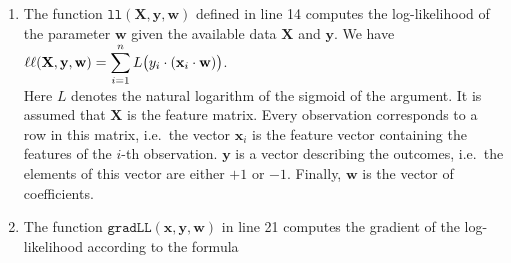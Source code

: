 \begin{enumerate}
      The argument that $\ln\bigl(1 + \exp(1000)\bigr) \approx 1000$ works as follows:
      \\[0.2cm]
      \hspace*{1.3cm}
      $
      \begin{array}{lcll}
        \ln\bigl(1+\exp(x)\bigr) & = & \ln\bigl(\exp(x) \cdot (1+\exp(-x))\bigr)          \\[0.2cm]
                                 & = & \ln\bigl(\exp(x)\bigr) + \ln\bigl(1+\exp(-x)\bigr) \\[0.2cm]
                                 & = & x + \ln\bigl(1+\exp(-x)\bigr) \\[0.2cm]
                                 & \approx & x + \ln(1) + \exp(-x) & \mbox{Taylor expansion of $\ln(1+x)$} \\[0.2cm]
                                 & = & x + 0 + \exp(-x)                                      \\[0.2cm]
                                 & \approx & x                & \mbox{since $\exp(-x) \approx 0$ for large $x$} 
      \end{array}
      $
      \\[0.2cm]
      This is the reason that \texttt{logSigmoid} returns \texttt{x} if the value of \texttt{x} is less than
      $-100$.
\item The function $\mathtt{ll}(\mathbf{X}, \mathbf{y}, \mathbf{w})$ defined in line 14 computes the
      log-likelihood of the parameter $\mathbf{w}$ given the available data $\mathbf{X}$ and $\mathbf{y}$.
      We have
      \\[0.2cm]
      \hspace*{1.3cm}
      $\displaystyle \ell\ell(\mathbf{X},\mathbf{y},\mathbf{w}) = 
           \sum\limits_{i=1}^n L\bigl(y_i \cdot(\mathbf{x}_i \cdot \mathbf{w})\bigr)
      $.
      \\[0.2cm]
      Here $L$ denotes the natural logarithm of the sigmoid of the argument.
      It is assumed that $\mathbf{X}$ is the feature matrix.  Every observation corresponds to a row in this
      matrix, i.e.~the vector $\mathbf{x}_i$ is the feature vector containing the features of the
      $i$-th observation.  $\mathbf{y}$ is a vector describing the outcomes, i.e.~the elements
      of this vector are either $+1$ or $-1$.  Finally, $\mathbf{w}$ is the vector of coefficients.
\item The function $\mathtt{gradLL}(\mathbf{x}, \mathbf{y}, \mathbf{w})$ in line 21 computes the gradient of
      the log-likelihood according to the formula

\end{enumerate}
